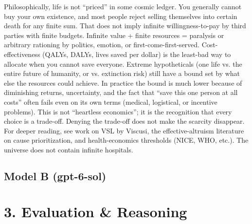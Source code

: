 \documentclass[11pt, a4paper]{article}
\begin{document}
{{        Philosophically, life is not ``priced'' in some cosmic ledger. You generally cannot buy your own existence, and most people reject selling themselves into certain death for any finite sum. That does not imply infinite willingness-to-pay by third parties with finite budgets. Infinite value + finite resources = paralysis or arbitrary rationing by politics, emotion, or first-come-first-served. Cost-effectiveness (QALYs, DALYs, lives saved per dollar) is the least-bad way to allocate when you cannot save everyone. Extreme hypotheticals (one life vs. the entire future of humanity, or vs. extinction risk) still have a bound set by what else the resources could achieve. In practice the bound is much lower because of diminishing returns, uncertainty, and the fact that ``save this one person at all costs'' often fails even on its own terms (medical, logistical, or incentive problems). This is not ``heartless economics''; it is the recognition that every choice is a trade-off. Denying the trade-off does not make the scarcity disappear. For deeper reading, see work on VSL by Viscusi, the effective-altruism literature on cause prioritization, and health-economics thresholds (NICE, WHO, etc.). The universe does not contain infinite hospitals.
    }%
}

\vspace{0.5cm}

\subsection*{Model B (gpt-6-sol)}
\noindent{}

\vspace{0.5cm}

\section*{3. Evaluation \& Reasoning}
\end{document}
